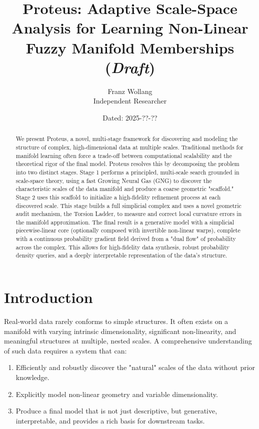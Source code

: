 \documentclass[11pt]{article}
\title{Proteus: Adaptive Scale-Space Analysis for Learning Non-Linear Fuzzy Manifold Memberships (\textit{Draft})}
\author{Franz Wollang\\ \small Independent Researcher}
\date{\small Dated: 2025-??-??}
\begin{document}
\maketitle

\begin{center}
\setlength{\fboxsep}{8pt}%
\end{center}
\vspace{1em}

\begin{abstract}
    We present Proteus, a novel, multi-stage framework for discovering and modeling the structure of complex, high-dimensional data at multiple scales. Traditional methods for manifold learning often force a trade-off between computational scalability and the theoretical rigor of the final model. Proteus resolves this by decomposing the problem into two distinct stages. Stage 1 performs a principled, multi-scale search grounded in scale-space theory, using a fast Growing Neural Gas (GNG) to discover the characteristic scales of the data manifold and produce a coarse geometric "scaffold." Stage 2 uses this scaffold to initialize a high-fidelity refinement process at each discovered scale. This stage builds a full simplicial complex and uses a novel geometric audit mechanism, the Torsion Ladder, to measure and correct local curvature errors in the manifold approximation. The final result is a generative model with a simplicial piecewise-linear core (optionally composed with invertible non-linear warps), complete with a continuous probability gradient field derived from a "dual flow" of probability across the complex. This allows for high-fidelity data synthesis, robust probability density queries, and a deeply interpretable representation of the data's structure.
\end{abstract}

\section{Introduction}

Real-world data rarely conforms to simple structures. It often exists on a manifold with varying intrinsic dimensionality, significant non-linearity, and meaningful structures at multiple, nested scales. A comprehensive understanding of such data requires a system that can:
\begin{enumerate}
    \item Efficiently and robustly discover the "natural" scales of the data without prior knowledge.
    \item Explicitly model non-linear geometry and variable dimensionality.
    \item Produce a final model that is not just descriptive, but generative, interpretable, and provides a rich basis for downstream tasks.
\end{enumerate}
\end{document}
